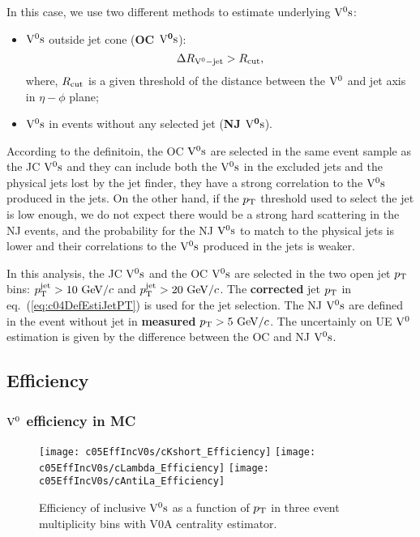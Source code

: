 In this case, we use two different methods to estimate underlying ${\rm V}^{0}{\rm s}$:
\begin{itemize}
\item ${\rm V}^{0}{\rm s}$ outside jet cone ({\bf OC $\mathbf{{\rm V}^{0}{\rm s}}$}):
      \begin{equation}\label{eq:c05OCV0s}
      \Delta R_{{\rm V}^{0}-{\rm jet}}>R_{\rm cut},
      \end{equation}
      where, $R_{\rm cut}$ is a given threshold of the distance between the
      ${\rm V}^{0}$ and jet axis in $\eta-\phi$ plane;
\item ${\rm V}^{0}{\rm s}$ in events without any selected jet ({\bf NJ $\mathbf{{\rm V}^{0}{\rm s}}$}).
\end{itemize}

According to the definitoin,
the OC ${\rm V}^{0}{\rm s}$ are selected in the same event sample as the JC ${\rm V}^{0}{\rm s}$
and they can include both the ${\rm V}^{0}{\rm s}$ in the excluded jets and
the physical jets lost by the jet finder,
they have a strong correlation to the ${\rm V}^{0}{\rm s}$ produced in the jets.
On the other hand, if the $p_{\rm T}$ threshold used to select the jet is low enough,
we do not expect there would be a strong hard scattering in the NJ events,
and the probability for the NJ ${\rm V}^{0}{\rm s}$ to match to the physical jets
is lower and their correlations to the ${\rm V}^{0}{\rm s}$ produced in the jets
is weaker.

In this analysis,
the JC ${\rm V}^{0}{\rm s}$ and the OC ${\rm V}^{0}{\rm s}$ are selected in the two open
jet $p_{\rm T}$ bins: $p_{\rm T}^{\rm jet}>10~{\rm GeV}/c$ and $p_{\rm T}^{\rm jet}>20~{\rm GeV}/c$.
The {\bf corrected} jet $p_{\rm T}$ in eq.~(\ref{eq:c04DefEstiJetPT}) is used
for the jet selection.
The NJ ${\rm V}^{0}{\rm s}$ are defined in the event without jet
in {\bf measured} $p_{\rm T}>5~{\rm GeV}/c$.
The uncertainly on UE ${\rm V}^{0}$ estimation is given by the
difference between the OC and NJ ${\rm V}^{0}{\rm s}$.

\subsection{Efficiency}

\subsubsection{${\rm V}^{0}$ efficiency in MC}
\label{sec:c05V0EffiMC}

\begin{figure}[htb]
\begin{center}
\texttt{[image: c05EffIncV0s/cKshort\_Efficiency]}
\texttt{[image: c05EffIncV0s/cLambda\_Efficiency]}
\texttt{[image: c05EffIncV0s/cAntiLa\_Efficiency]}
\caption{Efficiency of inclusive ${\rm V}^{0}{\rm s}$ as a function of $p_{\rm T}$
         in three event multiplicity bins with V0A centrality estimator.}
\label{fig:c05EffiIncV0s}
\end{center}
\end{figure}

